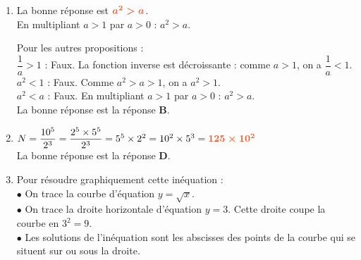 \documentclass[a4paper,11pt]{article}
\begin{document}
\newpage
\begin{seance}{} %

\begin{enumerate}
\item La bonne réponse est ${\color[HTML]{F15929}\boldsymbol{a^2 > a}}$.\\
En multipliant $a > 1$ par $a > 0$ : $a^2 > a$.

\medskip

Pour les autres propositions :\\
$\dfrac{1}{a} > 1$ : Faux. La fonction inverse est décroissante : comme $a > 1$, on a $\dfrac{1}{a} < 1$.\\
$a^2 < 1$ : Faux. Comme $a^2 > a > 1$, on a $a^2 > 1$.\\
$a^2 < a$ : Faux. En multipliant $a > 1$ par $a > 0$ : $a^2 > a$.\\La bonne réponse est la réponse {\bfseries \color[HTML]{F15929}B}.

\item $ N=\dfrac{10^5}{2^3}=\dfrac{2^5\times 5^5 }{2^3}=5^5\times 2^{2}=10^2\times 5^{3}={\color[HTML]{F15929}\boldsymbol{125\times 10^{2}}}$\\La bonne réponse est la réponse {\bfseries \color[HTML]{F15929}D}.

\item \begin{minipage}[c]{0.6\textwidth}
Pour résoudre graphiquement cette inéquation : \\
            $\bullet$ On trace la courbe d'équation $y=\sqrt{x}$. \\
            $\bullet$ On trace la droite horizontale d'équation $y=3$. Cette droite coupe la courbe en $3^2=9$. \\
            $\bullet$ Les solutions de l'inéquation sont les abscisses des points de la courbe qui se situent sur ou sous la droite.
          

\end{minipage} \hfill \begin{minipage}[c]{0.4\textwidth}
            \begin{tikzpicture}[baseline,scale=0.7]


\end{tikzpicture}
\end{minipage}
\end{enumerate}
\end{seance}
\end{document}
